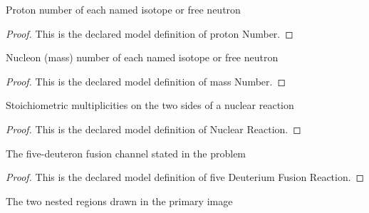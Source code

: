 \begin{definition}
  \label{def:physics:phyx-mini-0573:phyxminiproblems-problemphyxmini0573-nuclearspecies-protonnumber}
  Proton number of each named isotope or free neutron
\end{definition}
\begin{proof}
  This is the declared model definition of proton Number.
\end{proof}
\begin{definition}
  \label{def:physics:phyx-mini-0573:phyxminiproblems-problemphyxmini0573-nuclearspecies-massnumber}
  Nucleon (mass) number of each named isotope or free neutron
\end{definition}
\begin{proof}
  This is the declared model definition of mass Number.
\end{proof}
\begin{definition}
  \label{def:physics:phyx-mini-0573:phyxminiproblems-problemphyxmini0573-nuclearreaction}
  Stoichiometric multiplicities on the two sides of a nuclear reaction
\end{definition}
\begin{proof}
  This is the declared model definition of Nuclear Reaction.
\end{proof}
\begin{definition}
  \label{def:physics:phyx-mini-0573:phyxminiproblems-problemphyxmini0573-fivedeuteriumfusionreaction}
  The five-deuteron fusion channel stated in the problem
\end{definition}
\begin{proof}
  This is the declared model definition of five Deuterium Fusion Reaction.
\end{proof}
\begin{definition}
  \label{def:physics:phyx-mini-0573:phyxminiproblems-problemphyxmini0573-bombregion}
  The two nested regions drawn in the primary image
\end{definition}
